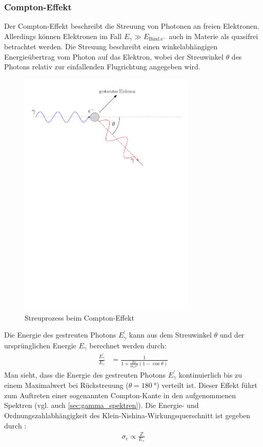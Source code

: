 \documentclass[11pt, a4paper]{article}
\numberwithin{equation}{section}
\begin{document}
\subsubsection{Compton-Effekt}
\label{sec:compton}
Der Compton-Effekt beschreibt die Streuung von Photonen an freien Elektronen.
Allerdings können Elektronen im Fall $E_\gamma \gg E_\mathrm{Bind. e^{-}}$ auch in Materie als quasifrei betrachtet werden.
Die Streuung beschreibt einen winkelabhängigen Energieübertrag vom Photon auf das Elektron, wobei der Streuwinkel $\theta$ des Photons relativ zur einfallenden Flugrichtung angegeben wird.
\begin{figure}
	\centering
	\includegraphics[width=0.75\textwidth]{./figures/compton.pdf}
	\caption{Streuprozess beim Compton-Effekt}
	\label{fig:comptoneffekt}
\end{figure}
Die Energie des gestreuten Photons $E_\gamma^\prime$ kann aus dem Streuwinkel $\theta$ und der ursprünglichen Energie $E_\gamma$ berechnet werden durch:
\begin{align}
	\frac{E_\gamma^\prime}{E_\gamma} &= \frac{1}{1 + \frac{h \nu}{m_\mathrm{e} c^2} (1-\cos\theta)}
\end{align}
Man sieht, dass die Energie des gestreuten Photons $E_\gamma^\prime$ kontinuierlich bis zu einem Maximalwert bei Rückstreuung ($\theta = \SI{180}{\degree}$) verteilt ist.
Dieser Effekt führt zum Auftreten einer sogenannten Compton-Kante in den aufgenommenen Spektren (vgl. auch \ref{sec:gamma_spektren}).
Die Energie- und Ordnungszahlabhängigkeit des Klein-Nishina-Wirkungsquerschnitt ist gegeben durch \cite{wermes}:
\begin{align}
	\sigma_\mathrm{c} \propto \frac{Z}{E_\gamma}
\end{align}
\end{document}
